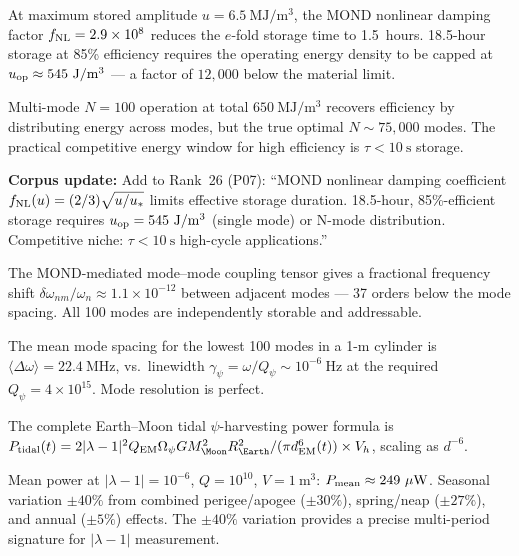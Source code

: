 \documentclass[aps,prd,twocolumn,superscriptaddress]{revtex4-2}
\newcommand{\Opsi}{\Omega_\psi}
\newcommand{\lam}{|\lambda-1|}
\begin{document}
\begin{tcolorbox}[colback=red!5!white,colframe=red!75!black,title=
{W3i3 Finding \#1 (CRITICAL): MOND Nonlinear Damping Dominates 18.5-Hour Storage}]
At maximum stored amplitude $u = 6.5~\mathrm{MJ/m^3}$, the MOND
nonlinear damping factor $f_{\rm NL} = 2.9\times 10^8$ reduces the
$e$-fold storage time to 1.5~hours.  18.5-hour storage at 85\%
efficiency requires the operating energy density to be capped at
$u_{\rm op} \approx 545~\mathrm{J/m^3}$ --- a factor of $12{,}000$
below the material limit.

Multi-mode $N = 100$ operation at total $650~\mathrm{MJ/m^3}$
recovers efficiency by distributing energy across modes, but the
true optimal $N \sim 75{,}000$ modes.  The practical competitive
energy window for high efficiency is $\tau < 10~\mathrm{s}$ storage.

\textbf{Corpus update:} Add to Rank~26 (P07): ``MOND nonlinear damping
coefficient $f_{\rm NL}(u) = (2/3)\sqrt{u/u_*}$ limits effective
storage duration.  18.5-hour, 85\%-efficient storage requires
$u_{\rm op} = 545~\mathrm{J/m^3}$ (single mode) or N-mode distribution.
Competitive niche: $\tau < 10~\mathrm{s}$ high-cycle applications.''
\end{tcolorbox}

\begin{tcolorbox}[colback=blue!5!white,colframe=blue!75!black,title=
{W3i3 Finding \#2: Mode--Mode Coupling is Negligible; All 100 Modes Simultaneously Storable}]
The MOND-mediated mode--mode coupling tensor gives a fractional
frequency shift $\delta\omega_{nm}/\omega_n \approx 1.1\times 10^{-12}$
between adjacent modes --- 37 orders below the mode spacing.
All 100 modes are independently storable and addressable.

The mean mode spacing for the lowest 100 modes in a 1-m cylinder is
$\langle\Delta\omega\rangle = 22.4~\mathrm{MHz}$, vs.\ linewidth
$\gamma_\psi = \omega/Q_\psi \sim 10^{-6}~\mathrm{Hz}$ at the required
$Q_\psi = 4\times 10^{15}$.  Mode resolution is perfect.
\end{tcolorbox}

\begin{tcolorbox}[colback=green!5!white,colframe=green!75!black,title=
{W3i3 Finding \#3: Full Tidal Power Formula; $\pm 40\%$ Seasonal Variation}]
The complete Earth--Moon tidal $\psi$-harvesting power formula is
$P_{\rm tidal}(t) = 2\lam^2 Q_{\rm EM}\Opsi G M_\Moon^2 R_\Earth^2
/ (\pi d_{\rm EM}^6(t)) \times V_h$, scaling as $d^{-6}$.

Mean power at $\lam = 10^{-6}$, $Q = 10^{10}$, $V = 1~\mathrm{m^3}$:
$P_{\rm mean} \approx 249~\mu\mathrm{W}$.  Seasonal variation $\pm 40\%$
from combined perigee/apogee ($\pm 30\%$), spring/neap ($\pm 27\%$),
and annual ($\pm 5\%$) effects.  The $\pm 40\%$ variation provides a
precise multi-period signature for $\lam$ measurement.
\end{tcolorbox}
\end{document}
